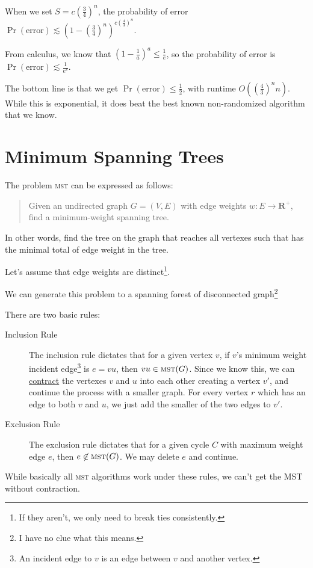                     When we set $S = c \left( \frac{3}{4} \right)^n$, the probability of error $\Pr(\text{error}) \lesssim (1 - \left( \frac{3}{4} \right)^n)^{c \left(\frac{4}{3} \right)^n}$.

                    From calculus, we know that $\left( 1 - \frac{1}{a} \right)^a \le \frac{1}{e}$, so the probability of error is $\Pr(\text{error}) \lesssim \frac{1}{e^c}$.

                    The bottom line is that we get $\Pr(\text{error}) \le \frac{1}{2}$, with runtime $O\left( \left(\frac{4}{3} \right)^n n \right)$.
                    While this is exponential, it does beat the best known non-randomized algorithm that we know.
        \chapter{Minimum Spanning Trees} %
        \label{cha:minimum_spanning_trees}
            The problem \textsc{mst} can be expressed as follows:
            \begin{quotation}
                Given an undirected graph $G = (V, E)$ with edge weights $w : E \to \mathbf{R}^+$, find a minimum-weight spanning tree.
            \end{quotation}
            In other words, find the tree on the graph that reaches all vertexes such that has the minimal total of edge weight in the tree.

            Let's assume that edge weights are distinct\footnote{If they aren't, we only need to break ties consistently.}.

            We can generate this problem to a spanning forest of disconnected graph\footnote{I have no clue what this means.} %

            There are two basic rules:
            \begin{description}
                \item[Inclusion Rule] The inclusion rule dictates that for a given vertex $v$, if $v$'s minimum weight incident edge\footnote{An incident edge to $v$ is an edge between $v$ and another vertex.} is $e = vu$, then $vu \in \textsc{mst}(G)$.
                    Since we know this, we can \uline{contract} the vertexes $v$ and $u$ into each other creating a vertex $v'$, and continue the process with a smaller graph.
                    For every vertex $r$ which has an edge to both $v$ and $u$, we just add the smaller of the two edges to $v'$.
                \item[Exclusion Rule] The exclusion rule dictates that for a given cycle $C$ with maximum weight edge $e$, then $e \not \in \textsc{mst}(G)$.
                    We may delete $e$ and continue.
            \end{description}
            While basically all \textsc{mst} algorithms work under these rules, we can't get the MST without contraction.

